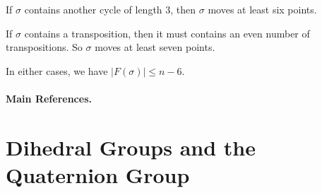 \begin{sketch}
\begin{enumerate}
\begin{enumerate}
			If $\sigma$ contains another cycle of length $3$, then $\sigma$ moves at least six points.
			
			If $\sigma$ contains a transposition, then it must contains an even number of transpositions. So $\sigma$ moves at least seven points.
			
			In either cases, we have $|F(\sigma)| \leq n-6$. \qedhere
		\end{enumerate}
	\end{enumerate}
	
\end{sketch}

\paragraph{Main References.} \cite{Suzuki1982,Lang2002,Hungerford1974,Li2025}

\newpage
\section{Dihedral Groups and the Quaternion Group}
